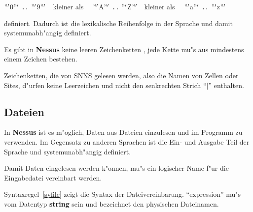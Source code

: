 \begin{center}
	  $"'$0$"'$ \verb&..& $"'$9$"'$~~kleiner als~~
          $"'$A$"'$ \verb&..& $"'$Z$"'$~~kleiner als~~
	  $"'$a$"'$ \verb&..& $"'$z$"'$
\end{center}

definiert. Dadurch ist die lexikalische Reihenfolge in der Sprache und
damit systemunabh"angig definiert.

Es gibt in {\bf Nessus} keine leeren Zeichenketten
, jede Kette mu"s aus mindestens einem
Zeichen bestehen.

Zeichenketten,  die von SNNS gelesen werden, also
die Namen von Zellen oder Sites, d"urfen keine Leerzeichen
 und nicht den senkrechten Strich ``$|$''
enthalten.


\pagebreak[1]
\subsection{Dateien}
\label{Dateien}

In {\bf Nessus} ist es m"oglich, Daten aus Dateien einzulesen und im
Programm zu verwenden. Im Gegensatz zu anderen Sprachen ist die Ein-
und Ausgabe Teil der Sprache und systemunabh"angig definiert.

Damit Daten eingelesen werden k"onnen, mu"s ein logischer Name f"ur
die Eingabedatei vereinbart werden.

Syntaxregel~\ref{syfile} zeigt die Syntax der Dateivereinbarung.
 ``expression'' mu"s vom Datentyp {\bf string}
 sein und bezeichnet den physischen Dateinamen.


\begin{center}
\end{center}

